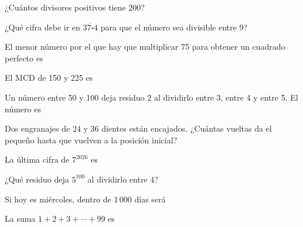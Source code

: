 \evaluacion
\begin{ejercicios}
\item ¿Cuántos divisores positivos tiene 200?
\item ¿Qué cifra debe ir en $\overline{37\square 4}$ para que el número sea divisible entre 9?
\item El menor número por el que hay que multiplicar 75 para obtener un cuadrado perfecto es
\item El MCD de 150 y 225 es
\item Un número entre 50 y 100 deja residuo 2 al dividirlo entre 3, entre 4 y entre 5. El número es
\item Dos engranajes de 24 y 36 dientes están encajados. ¿Cuántas vueltas da el pequeño hasta que vuelven a la posición inicial?
\item La última cifra de $7^{2026}$ es
\item ¿Qué residuo deja $5^{100}$ al dividirlo entre 4?
\item Si hoy es miércoles, dentro de 1\,000 días será
\item La suma $1 + 2 + 3 + \cdots + 99$ es
\end{ejercicios}
